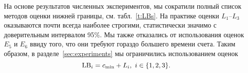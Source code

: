 \begin{table}[h!]

\centering
	\scriptsize
    \caption{Нижние границы}\label{t:LBs}
   \quad
\end{table}

На основе результатов численных экспериментов,
мы сократили полный список методов оценки нижней границы,
см. табл.~\ref{t:LBs}.
На практике оценки
$L_1$--$L_3$
оказываются почти всегда наиболее строгими,
статистически значимо
с доверительным интервалом 95\%.
Мы также отказались от использования оценок
$E_5$ и $E_6$
ввиду того,
что они требуют гораздо большего времени счета.
Таким образом,
в разделе~\ref{sec:experiments}
мы ограничились использованием оценок
\[
	\mathrm{LB}_i = c_{\min} + L_i,\ i\in\{1,2,3\}.
\]


